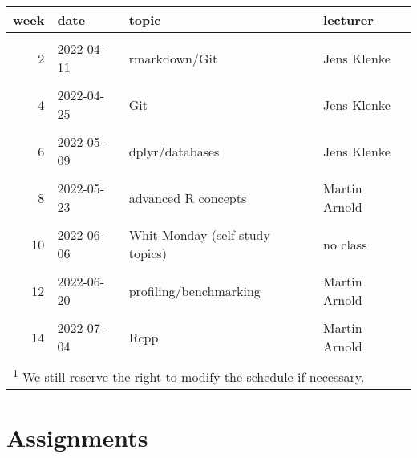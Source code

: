 \documentclass[]{article}
\begin{document}
\begin{table}[!h]
\centering
\begin{tabular}{rlll}
\toprule
week & date & topic & lecturer\\
\midrule
\cellcolor{gray!6}{1} & \cellcolor{gray!6}{2022-04-04} & \cellcolor{gray!6}{introduction} & \cellcolor{gray!6}{Jens Klenke}\\
2 & 2022-04-11 & rmarkdown/Git & Jens Klenke\\
\cellcolor{gray!6}{3} & \cellcolor{gray!6}{2022-04-18} & \cellcolor{gray!6}{Easter Monday (self-study topics)} & \cellcolor{gray!6}{no class}\\
4 & 2022-04-25 & Git & Jens Klenke\\
\cellcolor{gray!6}{5} & \cellcolor{gray!6}{2022-05-02} & \cellcolor{gray!6}{ggplot2} & \cellcolor{gray!6}{Jens Klenke}\\
6 & 2022-05-09 & dplyr/databases & Jens Klenke\\
\cellcolor{gray!6}{7} & \cellcolor{gray!6}{2022-05-16} & \cellcolor{gray!6}{web scraping} & \cellcolor{gray!6}{Jens Klenke}\\
8 & 2022-05-23 & advanced R concepts & Martin Arnold\\
\cellcolor{gray!6}{9} & \cellcolor{gray!6}{2022-05-30} & \cellcolor{gray!6}{functional programming} & \cellcolor{gray!6}{Martin Arnold}\\
10 & 2022-06-06 & Whit Monday  (self-study topics) & no class\\
\cellcolor{gray!6}{11} & \cellcolor{gray!6}{2022-06-13} & \cellcolor{gray!6}{object oriented programming} & \cellcolor{gray!6}{Martin Arnold}\\
12 & 2022-06-20 & profiling/benchmarking & Martin Arnold\\
\cellcolor{gray!6}{13} & \cellcolor{gray!6}{2022-06-27} & \cellcolor{gray!6}{improving performance} & \cellcolor{gray!6}{Martin Arnold}\\
14 & 2022-07-04 & Rcpp & Martin Arnold\\
\cellcolor{gray!6}{15} & \cellcolor{gray!6}{2022-07-11} & \cellcolor{gray!6}{RcppAramdillo} & \cellcolor{gray!6}{Martin Arnold}\\
\bottomrule
\multicolumn{4}{l}{\textsuperscript{1} We still reserve the right to modify the schedule if necessary.}\\
\end{tabular}
\end{table}

\hypertarget{assignments}{%
\section{Assignments}\label{assignments}}
\end{document}
